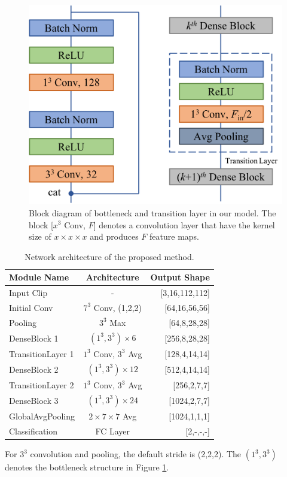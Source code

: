 \documentclass[10pt,twocolumn,letterpaper]{article}
\begin{document}

\begin{figure}[t]
\begin{center}
\includegraphics[scale=0.30]{fig/fig2.png}
\end{center}
\caption{Block diagram of bottleneck and transition layer in our model. The block [$x^3$ Conv, $F$] denotes a convolution layer that have the kernel size of $x \times x \times x$ and produces $F$ feature maps.}
\label{fig:bottleneck}
\end{figure}

\begin{table}
\begin{center}
\caption{Network architecture of the proposed method.}
\label{table:arch}
\begin{tabular}{lcr}
\hline
\textbf{Module Name} & \textbf{Architecture} & \textbf{Output Shape} \\
\hline\hline
Input Clip & - & [3,16,112,112] \\
Initial Conv & $7^3$ Conv, (1,2,2) & [64,16,56,56] \\
Pooling & $3^3$ Max & [64,8,28,28] \\
DenseBlock 1 & $(1^3, 3^3) \times 6$ & [256,8,28,28] \\
TransitionLayer 1 & $1^3$ Conv, $3^3$ Avg & [128,4,14,14]\\
DenseBlock 2 & $(1^3, 3^3) \times 12$ & [512,4,14,14] \\
TransitionLayer 2 & $1^3$ Conv, $3^3$ Avg & [256,2,7,7] \\
DenseBlock 3 & $(1^3, 3^3) \times 24$ & [1024,2,7,7]\\
GlobalAvgPooling & $2 \times 7 \times 7$ Avg & [1024,1,1,1]\\
Classification & FC Layer & [2,-,-,-] \\
\hline
\end{tabular}
\end{center}
\footnotesize
For $3^3$ convolution and pooling, the default stride is (2,2,2). The $(1^3, 3^3)$ denotes the bottleneck structure in Figure \ref{fig:bottleneck}.
\end{table}
\end{document}
